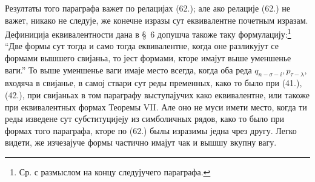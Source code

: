 ﻿\documentclass[11pt]{article}
\begin{document}
Резултаты того параграфа важет по релацијах (62.); але ако релације (62.) не важет, никако не следује, же конечне изразы сут еквивалентне почетным изразам. Дефиниција еквивалентности дана в \S\ 6 допушча такоже таку формулацију:\footnote{Ср. с размыслом на концу следујучего параграфа.} ``Две формы сут тогда и само тогда еквивалентне, когда оне разликујут се формами вышшего свијаньа, то јест формами, кторе имајут выше уменшенье ваги.'' То выше уменшенье ваги имаје место всегда, когда оба реда $q_{n-\sigma-i},p_{\tau-\lambda}$, входяча в свијанье, в самој ствари сут реды пременных, како то было при (41.), (42.), при свијаньах в том параграфу выступајучих како еквивалентне, или такоже при еквивалентных формах Теоремы VII. Але оно не муси имети место, когда ти реды изведене сут субституцијеју из симболичных рядов, како то было при формах того параграфа, кторе по (62.) былы изразимы једна чрез другу. Легко видети, же изчезајуче формы частично имајут чак и вышшу вкупну вагу.
\end{document}
